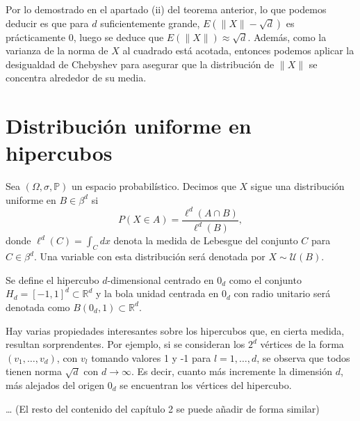\begin{remark}
Por lo demostrado en el apartado (ii) del teorema anterior, lo que podemos deducir es que para $d$ suficientemente grande, $E(\|X\| - \sqrt{d})$ es prácticamente 0, luego se deduce que $E(\|X\|) \approx \sqrt{d}$. Además, como la varianza de la norma de $X$ al cuadrado está acotada, entonces podemos aplicar la desigualdad de Chebyshev para asegurar que la distribución de $\|X\|$ se concentra alrededor de su media.
\end{remark}

\section{Distribución uniforme en hipercubos}

\begin{definition}
Sea $\left(\Omega,\sigma,\mathbb{P}\right)$ un espacio probabilístico. Decimos que $X$ sigue una distribución uniforme en $B \in \beta^d$ si
\[ P(X \in A) = \frac{\ell^d(A \cap B)}{\ell^d(B)}, \]
donde $\ell^d(C) = \int_C dx$ denota la medida de Lebesgue del conjunto $C$ para $C \in \beta^d$. Una variable con esta distribución será denotada por $X \sim \mathcal{U}(B)$.
\end{definition}

\begin{definition}
Se define el hipercubo $d$-dimensional centrado en $0_d$ como el conjunto $H_d = [-1, 1]^d \subset \mathbb{R}^d$ y la bola unidad centrada en $0_d$ con radio unitario será denotada como $B(0_d, 1) \subset \mathbb{R}^d$.
\end{definition}

Hay varias propiedades interesantes sobre los hipercubos que, en cierta medida, resultan sorprendentes. Por ejemplo, si se consideran los $2^d$ vértices de la forma $(v_1, \dots, v_d)$, con $v_l$ tomando valores 1 y -1 para $l = 1, \dots, d$, se observa que todos tienen norma $\sqrt{d}$ con $d \to \infty$. Es decir, cuanto más incremente la dimensión $d$, más alejados del origen $0_d$ se encuentran los vértices del hipercubo.

\dots
(El resto del contenido del capítulo 2 se puede añadir de forma similar)
